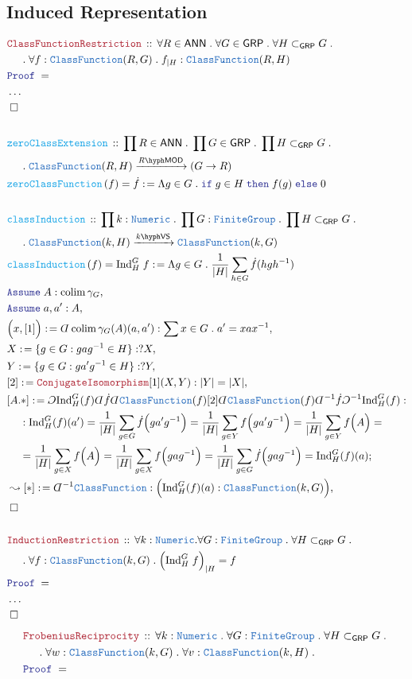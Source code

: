 \documentclass[12pt]{scrartcl}%
\newcommand{\TYPE}[1]{\textcolor{NavyBlue}{\mathtt{#1}}}%
\newcommand{\FUNC}[1]{\textcolor{Cerulean}{\mathtt{#1}}}%
\newcommand{\LOGIC}[1]{\textcolor{Blue}{\mathtt{#1}}}%
\newcommand{\THM}[1]{\textcolor{Maroon}{\mathtt{#1}}}%
\renewcommand{\.}{\; . \;} %
\newcommand{\de}{: \kern 0.1pc =} %
\newcommand{\If}{\LOGIC{if} \;} %
\newcommand{\Then}{ \; \LOGIC{then} \;} %
\newcommand{\Else}{\; \LOGIC{else} \;} %
\newcommand{\Act}[1]{\left( #1 \right)} %
\newcommand{\Theorem}[2]{& \THM{#1} \, :: \, #2 \\ & \Proof = \\ } %
\newcommand{\DeclareFunc}[2]{& \FUNC{#1} \, :: \, #2 \\}%
\newcommand{\DefineNamedFunc}[4]{&  \FUNC{#1}\Act{#2} = #3 \de #4 \\}%
\newcommand{\NewLine}{\\ & \kern 1pc}%
\newcommand{\Page}[1]{ \begin{align*} #1 \end{align*}  }%
\newcommand{ \bd }{ \ByDef }%
\newcommand{\NoProof}{ & \ldots \\ \EndProof}%
\newcommand{\Say}[3]{& #1 \de #2 : #3, \\} %
\newcommand{\Conclude}[3]{& #1 \de #2 : #3; \\}%
\newcommand{\Derive}[3]{& \leadsto #1 \de #2 : #3, \\} %
\newcommand{\Assume}[2]{& \LOGIC{Assume} \; #1 : #2, \\} %
\newcommand{\QED}{\; \square} %
\newcommand{\EndProof}{& \QED \\} %
\newcommand{\ByDef}{\rotatebox[origin=c]{-180}{$D$}}%
\newcommand{\ByConstr}{\rotatebox[origin=c]{-180}{$C$}}%
\newcommand{\Proof}{\LOGIC{Proof} \; } %
\newcommand{\Arrow}[1]{\xrightarrow{#1}}%
\DeclareMathOperator*{\colim}{colim}%
\newcommand{\Sgrp}{\subset_{\mathsf{GRP}}} %
\newcommand{\FG}{\TYPE{FiniteGroup}} %
\newcommand{\GRP}{\mathsf{GRP}} %
\newcommand{\VS}[1]{#1\hyph\mathsf{VS}} %
\newcommand{\LMOD}[1]{#1\hyph\mathsf{MOD}} %
\newcommand{\ANN}{\mathsf{ANN}} %
\begin{document}
\subsection{Induced Representation}
\Page{
	\Theorem{ClassFunctionRestriction}
	{
		\forall R \in \ANN \.
		\forall G \in \GRP \.
		\forall H \Sgrp G \. \NewLine \.
		\forall f : \TYPE{ClassFunction}(R,G) \.
		f_{|H} : \TYPE{ClassFunction}(R,H)
	}
	\NoProof
	\\
	\DeclareFunc{zeroClassExtension}{
		\prod R \in \ANN \.
		\prod G \in \GRP \.
		\prod H \Sgrp G \. 
		\NewLine \.
		\TYPE{ClassFunction}(R,H) \Arrow{\LMOD{R}} (G \to R)
	}
	\DefineNamedFunc{zeroClassFunction}{f}{\dot f}
	{
		\Lambda g \in G \.
		\If  g \in H \Then f(g) \Else 0
	}
	\\
	\DeclareFunc{classInduction}
	{
		\prod k : \TYPE{Numeric} \.
		\prod G : \FG \.
		\prod H \Sgrp G \. \NewLine \. 
		\TYPE{ClassFunction}(k, H) \Arrow{\VS{k}} \TYPE{ClassFunction} (k,G)
	}
	\DefineNamedFunc{classInduction}{f}{\mathrm{Ind}^G_H\;f}
	{ \Lambda g \in G \. \frac{1}{|H|} \sum_{h \in G} \dot f(hgh^{-1})  }
	\Assume{A}{\colim \gamma_G}
	\Assume{a,a'}{ A  }
	\Say{\Big(x,[1] \Big)}
	{
		\bd \colim \gamma_G (A)(a,a')
	}
	{
		\sum x \in G \. a' = xax^{-1}
	}
	\Say{X}{\{g \in G : gag^{-1} \in H \}}{?X}
	\Say{Y}{\{g \in G : ga'g^{-1} \in H \}}{?Y}
	\Say{[2]}{\THM{ConjugateIsomorphism}[1](X,Y)}{ |Y| = |X|  }
	\Conclude{[A.*]}{
		\ByConstr \mathrm{Ind}^G_H(f)
		\bd \dot f 
		\bd \TYPE{ClassFunction}(f)
		[2]
		\bd \TYPE{ClassFunction}(f)
		\bd^{-1} \dot f 
		\ByConstr^{-1} \mathrm{Ind}^G_H(f)
	}
	{
		\NewLine : 
		\mathrm{Ind}^G_H(f)(a') = 
		\frac{1}{|H|} \sum_{g \in G} \dot f\Big(ga'g^{-1}\Big) = 
		\frac{1}{|H|} \sum_{g \in Y} f\Big(ga'g^{-1}\Big)  =
		\frac{1}{|H|} \sum_{g \in Y} f\Big(A\Big) = \NewLine = 
		\frac{1}{|H|} \sum_{g \in X} f\Big(A\Big) = 
		\frac{1}{|H|} \sum_{g \in X} f\Big(gag^{-1}\Big) =  
		\frac{1}{|H|} \sum_{g \in G} \dot f\Big(gag^{-1}\Big) = 
		\mathrm{Ind}^G_H(f)(a)  
	}
	\Derive{[*]}{\bd^{-1} \TYPE{ClassFunction}}
	{
		\Big( \mathrm{Ind}^G_H(f)(a) : \TYPE{ClassFunction}(k,G) \Big)
	}
	\EndProof
	\\
	\Theorem{InductionRestriction}
	{	
		\forall k : \TYPE{Numeric}.
		\forall G : \FG \.
		\forall H \Sgrp G \. \NewLine \.
		\forall f : \TYPE{ClassFunction}(k,G) \.
		\Big(\mathrm{Ind}^G_H \; f\Big)_{|H} = f
	}
	\NoProof
}\Page{
	\Theorem{FrobeniusReciprocity}
	{
		\forall k : \TYPE{Numeric} \.
		\forall G : \FG \.
		\forall H \Sgrp G \. \NewLine \.
		\forall w : \TYPE{ClassFunction}(k,G) \.
		\forall v : \TYPE{ClassFunction}(k,H) \.
}}
\end{document}
